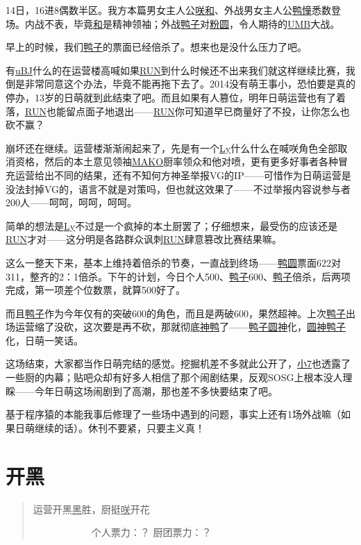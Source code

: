 14日，16进8偶数半区。我方本篇男女主人公\uline{咲}\uline{和}、外战男女主人公\uline{鸭}\uline{憧}悉数登场。内战不表，毕竟\uline{和}是精神领袖；外战\uline{鸭子}对\uline{粉圆}，令人期待的\uline{UMB}大战。

早上的时候，我们\uline{鸭子}的票面已经倍杀了。想来也是没什么压力了吧。

有\uline{uBJ}什么的在运营楼高喊如果\uline{RUN}到什么时候还不出来我们就这样继续比赛，我倒是非常同意这个办法，毕竟不能再拖下去了。2014没有萌王事小，恐怕要是真的停办，13岁的日萌就到此结束了吧。而且如果有人篡位，明年日萌运营也有了着落，\uline{RUN}也能留点面子地退出——\uline{RUN}你可知道早已商量好了不投，让你怎么也砍不赢？

崩坏还在继续。运营楼渐渐闹起来了，先是有一个\uline{Ly}什么什么在喊咲角色全部取消资格，然后的本土意见领袖\uline{MAKO}厨率领众和他对喷，更有更多好事者各种冒充运营给出不同的结果，还有不知何方神圣举报VG的IP——可惜作为日萌运营是没法封掉VG的，语言不就是对策吗，但也就这效果了——不过举报内容说参与者200人——呵呵，呵呵，呵呵。

简单的想法是\uline{Ly}不过是一个疯掉的本土厨罢了；仔细想来，最受伤的应该还是\uline{RUN}才对——这分明是各路群众讽刺\uline{RUN}肆意篡改比赛结果嘛。

这么一整天下来，基本上维持着倍杀的节奏，一直战到终场——\uline{鸭}\uline{圆}票面622对311，整齐的2：1倍杀。下午的计划，今日个人500、\uline{鸭子}600、\uline{鸭子}倍杀，后两项完成，第一项差个位数票，就算500好了。

而且\uline{鸭子}作为今年仅有的突破600的角色，而且是两破600，果然超神。上次\uline{鸭子}出场运营缩了没砍，这次要是再不砍，那就彻底\uline{神鸭}了——\uline{鸭子}\uline{圆神}化，\uline{圆神}\uline{鸭子}化，日萌一笑话。

这场结束，大家都当作日萌完结的感觉。挖掘机差不多就此公开了，\uline{小7}也透露了一些厨的内幕；贴吧众却有好多人相信了那个闹剧结果，反观SOSG上根本没人理睬——今年日萌这场闹剧到了高潮，那也差不多快要结束了吧。

基于程序猿的本能我事后修理了一些场中遇到的问题，事实上还有1场外战嘛（如果日萌继续的话）。休刊不要紧，只要主义真！

\chapter{开黑}
\begin{quote}
运营开黑\uline{黑}胜，厨挺\uline{咲}开花

　　　　　　个人票力：？ 厨团票力：？
\end{quote}

